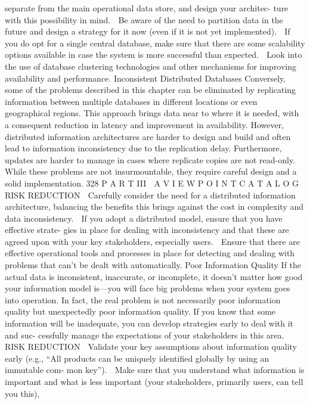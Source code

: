 separate from the main operational data store, and design your architec-
ture with this possibility in mind.
 Be aware of the need to partition data in the future and design a strategy
for it now (even if it is not yet implemented).
 If you do opt for a single central database, make sure that there are some
scalability options available in case the system is more successful than
expected.
 Look into the use of database clustering technologies and other mechanisms
for improving availability and performance.
Inconsistent Distributed Databases
Conversely, some of the problems described in this chapter can be eliminated by
replicating information between multiple databases in different locations or
even geographical regions. This approach brings data near to where it is
needed, with a consequent reduction in latency and improvement in availability.
However, distributed information architectures are harder to design and
build and often lead to information inconsistency due to the replication delay.
Furthermore, updates are harder to manage in cases where replicate copies
are not read-only. While these problems are not insurmountable, they require
careful design and a solid implementation.
328
 P A R T III  A V I E W P O I N T C A T A L O G
RISK REDUCTION
 Carefully consider the need for a distributed information architecture,
balancing the benefits this brings against the cost in complexity and data
inconsistency.
 If you adopt a distributed model, ensure that you have effective strate-
gies in place for dealing with inconsistency and that these are agreed
upon with your key stakeholders, especially users.
 Ensure that there are effective operational tools and processes in place for
detecting and dealing with problems that can’t be dealt with automatically.
Poor Information Quality
If the actual data is inconsistent, inaccurate, or incomplete, it doesn’t matter
how good your information model is—you will face big problems when your
system goes into operation.
In fact, the real problem is not necessarily poor information quality but
unexpectedly poor information quality. If you know that some information
will be inadequate, you can develop strategies early to deal with it and suc-
cessfully manage the expectations of your stakeholders in this area.
RISK REDUCTION
 Validate your key assumptions about information quality early (e.g., “All
products can be uniquely identified globally by using an immutable com-
mon key”).
 Make sure that you understand what information is important and what
is less important (your stakeholders, primarily users, can tell you this),
